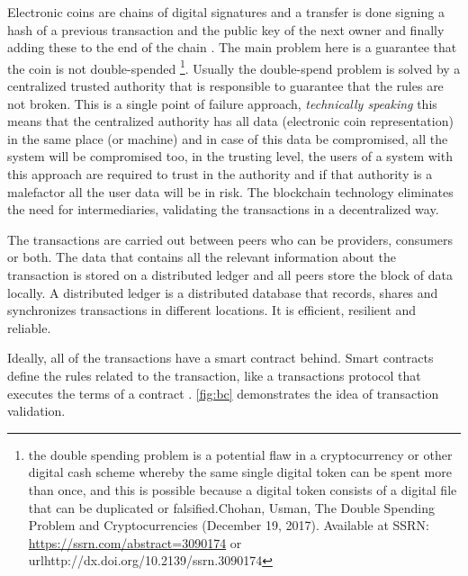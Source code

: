 Electronic coins are chains of digital signatures and a transfer is done signing a hash of a previous transaction and the public key of the next owner and finally adding these to the end of the chain \cite{bitcoin}. The main problem here is a guarantee that the coin is not double-spended \footnote{the ​double spending problem ​is a potential flaw in a cryptocurrency or other digital cash scheme whereby the same single digital token can be spent more than once, and this is possible because a digital token consists of a digital file that can be duplicated or falsified.Chohan, Usman, The Double Spending Problem and Cryptocurrencies (December 19, 2017). Available at SSRN: \url{https://ssrn.com/abstract=3090174} or url{http://dx.doi.org/10.2139/ssrn.3090174}}. Usually the double-spend problem is solved by a centralized trusted authority that is responsible to guarantee that the rules are not broken. This is a single point of failure approach, \textit{technically speaking} this means that the centralized authority has all data (electronic coin representation) in the same place (or machine) and in case of this data be compromised, all the system will be compromised too, in the trusting level, the users of a system with this approach are required to trust in the authority and if that authority is a malefactor all the user data will be in risk.  The blockchain technology eliminates the need for intermediaries, validating the transactions in a decentralized way. 


The transactions are carried out between peers who can be providers, consumers or both. The data that contains all the relevant information about the transaction is stored on a distributed ledger and all peers store the block of data locally. A distributed ledger is a distributed database that records, shares and synchronizes transactions in different locations. It is efficient, resilient and reliable. 


Ideally, all of the transactions have a smart contract behind. Smart contracts define the rules related to the transaction, like a transactions protocol that executes the terms of a contract \cite{SmartContracts}. \cref{fig:bc} demonstrates the idea of transaction validation.



